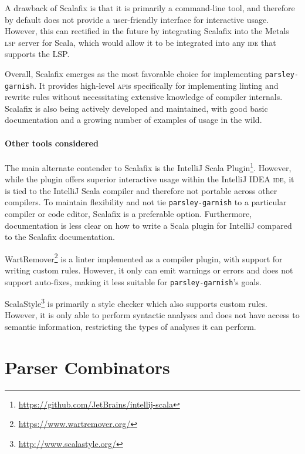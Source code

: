 A drawback of Scalafix is that it is primarily a command-line tool, and therefore by default does not provide a user-friendly interface for interactive usage.
However, this can rectified in the future by integrating Scalafix into the Metals \textsc{lsp} server for Scala, which would allow it to be integrated into any \textsc{ide} that supports the LSP.

Overall, Scalafix emerges as the most favorable choice for implementing \texttt{parsley-garnish}.
It provides high-level \textsc{api}s specifically for implementing linting and rewrite rules without necessitating extensive knowledge of compiler internals.
Scalafix is also being actively developed and maintained, with good basic documentation and a growing number of examples of usage in the wild.

\subsubsection{Other tools considered}
The main alternate contender to Scalafix is the IntelliJ Scala Plugin\footnote{\url{https://github.com/JetBrains/intellij-scala}}.
However, while the plugin offers superior interactive usage within the IntelliJ IDEA \textsc{ide}, it is tied to the IntelliJ Scala compiler and therefore not portable across other compilers.
To maintain flexibility and not tie \texttt{parsley-garnish} to a particular compiler or code editor, Scalafix is a preferable option.
Furthermore, documentation is less clear on how to write a Scala plugin for IntelliJ compared to the Scalafix documentation.

WartRemover\footnote{\url{https://www.wartremover.org/}} is a linter implemented as a compiler plugin, with support for writing custom rules.
However, it only can emit warnings or errors and does not support auto-fixes, making it less suitable for \texttt{parsley-garnish}'s goals.

ScalaStyle\footnote{\url{http://www.scalastyle.org/}} is primarily a style checker which also supports custom rules.
However, it is only able to perform syntactic analyses and does not have access to semantic information, restricting the types of analyses it can perform.


\chapter{Parser Combinators}

